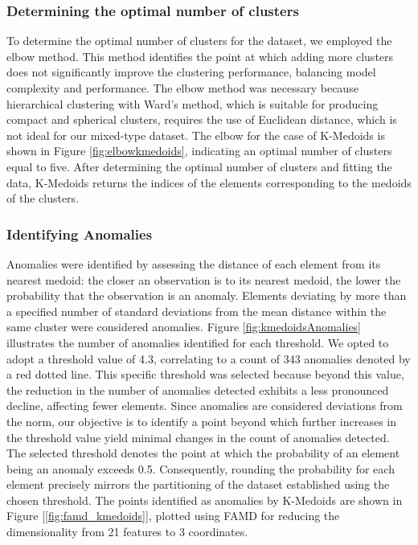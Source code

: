 \documentclass[a4paper]{article}
\begin{document}
\subsubsection{Determining the optimal number of clusters}
To determine the optimal number of clusters for the dataset, we employed the elbow method. This method identifies the point at which adding more clusters does not significantly improve the clustering performance, balancing model complexity and performance. The elbow method was necessary because hierarchical clustering with Ward's method, which is suitable for producing compact and spherical clusters, requires the use of Euclidean distance, which is not ideal for our mixed-type dataset. \newline
The elbow for the case of K-Medoids is shown in Figure \ref{fig:elbowkmedoids}, indicating an optimal number of clusters equal to five. After determining the optimal number of clusters and fitting the data, K-Medoids returns the indices of the elements corresponding to the medoids of the clusters. \newline
\subsubsection{Identifying Anomalies}
Anomalies were identified by assessing the distance of each element from its nearest medoid: the closer an observation is to its nearest medoid, the lower the probability that the observation is an anomaly. Elements deviating by more than a specified number of standard deviations from the mean distance within the same cluster were considered anomalies. Figure \ref{fig:kmedoidsAnomalies} illustrates the number of anomalies identified for each threshold. We opted to adopt a threshold value of 4.3, correlating to a count of 343 anomalies denoted by a red dotted line. This specific threshold was selected because beyond this value, the reduction in the number of anomalies detected exhibits a less pronounced decline, affecting fewer elements. Since anomalies are considered deviations from the norm, our objective is to identify a point beyond which further increases in the threshold value yield minimal changes in the count of anomalies detected. The selected threshold denotes the point at which the probability of an element being an anomaly exceeds 0.5. Consequently, rounding the probability for each element precisely mirrors the partitioning of the dataset established using the chosen threshold.
The points identified as anomalies by K-Medoids are shown in Figure [\ref{fig:famd_kmedoids}], plotted using FAMD for reducing the dimensionality from 21 features to 3 coordinates.
\end{document}
